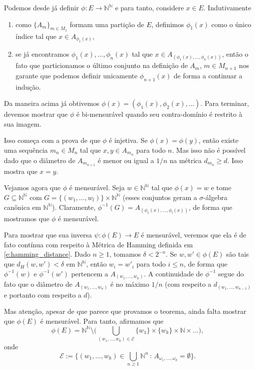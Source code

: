   Podemos desde já definir $\phi:E \to \mathbb{N}^\mathbb{N}$ e para tanto, considere $x \in E$.
  Indutivamente
  \begin{enumerate}[\quad a)]
  \item como $\{A_m\}_{m \in M_1}$ formam uma partição de $E$, definimos $\phi_1(x)$ como o único índice tal que $x \in A_{\phi_1(x)}$,
  \item se já encontramos $\phi_1(x), \dots, \phi_n(x)$ tal que $x \in A_{(\phi_1(x), \dots, \phi_n(x))}$, então o fato que particionamos o último conjunto na definição de $A_m$, $m \in M_{n+1}$ nos garante que podemos definir unicamente $\phi_{n+1}(x)$ de forma a continuar a indução.
  \end{enumerate}
  Da maneira acima já obtivemos $\phi(x) = (\phi_1(x), \phi_2(x), \dots)$.
  Para terminar, devemos mostrar que $\phi$ é bi-mensurável quando seu contra-domínio é restrito à sua imagem.

  Isso começa com a prova de que $\phi$ é injetiva.
  Se $\phi(x) = \phi(y)$, então existe uma sequência $m_n \in M_n$ tal que $x, y \in A_{m_n}$ para todo $n$.
  Mas isso não é possível dado que o diâmetro de $A_{m_{n+1}}$ é menor ou igual a $1/n$ na métrica $d_{m_n} \geq d$.
  Isso mostra que $x = y$.

  Vejamos agora que $\phi$ é mensurável.
  Seja $w \in \mathbb{N}^\mathbb{N}$ tal que $\phi(x) = w$ e tome $G \subseteq \mathbb{N}^\mathbb{N}$ com $G = \{(w_1, \dots, w_l)\} \times \mathbb{N}^\mathbb{N}$ (esses conjuntos geram a $\sigma$-álgebra canônica em $\mathbb{N}^\mathbb{N}$).
  Claramente, $\phi^{-1}(G) = A_{(\phi_1(x), \dots, \phi_l(x))}$, de forma que mostramos que $\phi$ é mensurável.

  Para mostrar que sua inversa $\psi:\phi(E) \to E$ é mensurável, veremos que ela é de fato contínua com respeito à Métrica de Hamming definida em \eqref{e:hamming_distance}.
  Dado $n \geq 1$, tomamos $\delta < 2^{-n}$.
  Se $w, w' \in \phi(E)$ são tais que $d_H(w, w') < \delta$ em $\mathbb{N}^\mathbb{N}$, então $w_i = w'_i$ para todo $i \leq n$, de forma que $\phi^{-1}(w)$ e $\phi^{-1}(w')$ pertencem a $A_{(w_1, \dots, w_n)}$.
  A continuidade de $\phi^{-1}$ segue do fato que o diâmetro de $A_{(w_1, \dots, w_n)}$ é no máximo $1/n$ (com respeito a $d_{(w_1, \dots, w_{n-1})}$ e portanto com respeito a $d$).

  Mas atenção, apesar de que parece que provamos o teorema, ainda falta mostrar que $\phi(E)$ é mensurável.
  Para tanto, afirmamos que
  \begin{equation}
    \label{e:phiE_mensur}
    \phi(E) = \mathbb{N}^\mathbb{N} \setminus \Big( \bigcup_{(w_1, \dots, w_k)\in \mathcal{E}} \{w_1\} \times \{w_k\} \times \mathbb{N} \times \dots \Big),
  \end{equation}
  onde
  \begin{equation*}
   \mathcal{E}:=\{ (w_1, \dots, w_k)\in \bigcup_{n\ge 1} \mathbb{N}^n \, : \, A_{\omega_1,\dots,\omega_k}=\emptyset \}.
  \end{equation*}

